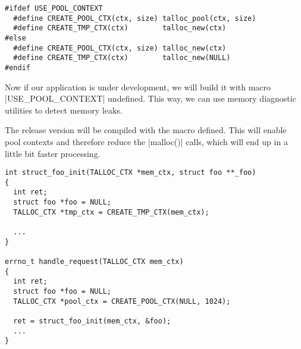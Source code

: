 \begin{lstlisting}[caption={Conditional temporary context
macros},label=lst:tmp-ctx-4]
#ifdef USE_POOL_CONTEXT
  #define CREATE_POOL_CTX(ctx, size) talloc_pool(ctx, size)
  #define CREATE_TMP_CTX(ctx)        talloc_new(ctx)
#else
  #define CREATE_POOL_CTX(ctx, size) talloc_new(ctx)
  #define CREATE_TMP_CTX(ctx)        talloc_new(NULL)
#endif
\end{lstlisting}

Now if our application is under development, we will build it with macro
|USE_POOL_CONTEXT| undefined. This way, we  can use memory diagnostic
utilities to detect memory leaks.

The release version will be compiled with the macro defined. This will  enable
pool contexts and therefore reduce the |malloc()| calls, which will end up in a
little bit faster processing.

\begin{lstlisting}[caption={Conditional temporary context},label=lst:tmp-ctx-5]
int struct_foo_init(TALLOC_CTX *mem_ctx, struct foo **_foo)
{
  int ret;
  struct foo *foo = NULL;
  TALLOC_CTX *tmp_ctx = CREATE_TMP_CTX(mem_ctx);

  ...
}

errno_t handle_request(TALLOC_CTX mem_ctx)
{
  int ret;
  struct foo *foo = NULL;
  TALLOC_CTX *pool_ctx = CREATE_POOL_CTX(NULL, 1024);
  
  ret = struct_foo_init(mem_ctx, &foo);
  ...
}
\end{lstlisting}